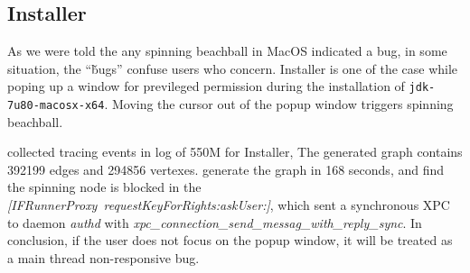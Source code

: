 \subsection{Installer}

As we were told the any spinning beachball in MacOS indicated a bug, in some
situation, the ``\v{bugs}'' confuse users who concern. Installer is one of the
case while poping up a window for previleged permission during the installation
of \texttt{jdk-7u80-macosx-x64}. Moving the cursor out of the popup window
triggers spinning beachball.

\xxx collected tracing events in log of 550M for Installer, The generated graph
contains 392199 edges and 294856 vertexes. \xxx generate the graph in 168
seconds, and find the spinning node is blocked in the \textit{[IFRunnerProxy\
requestKeyForRights:askUser:]}, which sent a synchronous XPC to daemon
\textit{authd} with \textit{xpc\_connection\_send\_messag\_with\_reply\_sync}.
In conclusion, if the user does not focus on the popup window, it will be
treated as a main thread non-responsive bug.
